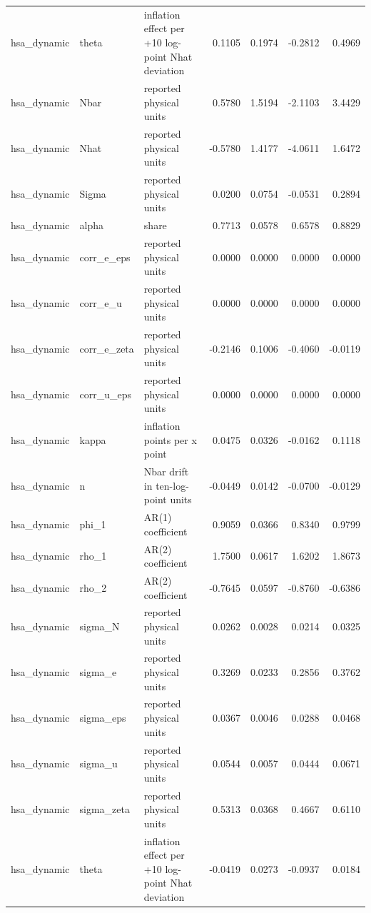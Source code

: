\begin{tabular}{lllrrrr}
hsa\_dynamic & theta & inflation effect per +10 log-point Nhat deviation & 0.1105 & 0.1974 & -0.2812 & 0.4969 \\
hsa\_dynamic & Nbar & reported physical units & 0.5780 & 1.5194 & -2.1103 & 3.4429 \\
hsa\_dynamic & Nhat & reported physical units & -0.5780 & 1.4177 & -4.0611 & 1.6472 \\
hsa\_dynamic & Sigma & reported physical units & 0.0200 & 0.0754 & -0.0531 & 0.2894 \\
hsa\_dynamic & alpha & share & 0.7713 & 0.0578 & 0.6578 & 0.8829 \\
hsa\_dynamic & corr\_e\_eps & reported physical units & 0.0000 & 0.0000 & 0.0000 & 0.0000 \\
hsa\_dynamic & corr\_e\_u & reported physical units & 0.0000 & 0.0000 & 0.0000 & 0.0000 \\
hsa\_dynamic & corr\_e\_zeta & reported physical units & -0.2146 & 0.1006 & -0.4060 & -0.0119 \\
hsa\_dynamic & corr\_u\_eps & reported physical units & 0.0000 & 0.0000 & 0.0000 & 0.0000 \\
hsa\_dynamic & kappa & inflation points per x point & 0.0475 & 0.0326 & -0.0162 & 0.1118 \\
hsa\_dynamic & n & Nbar drift in ten-log-point units & -0.0449 & 0.0142 & -0.0700 & -0.0129 \\
hsa\_dynamic & phi\_1 & AR(1) coefficient & 0.9059 & 0.0366 & 0.8340 & 0.9799 \\
hsa\_dynamic & rho\_1 & AR(2) coefficient & 1.7500 & 0.0617 & 1.6202 & 1.8673 \\
hsa\_dynamic & rho\_2 & AR(2) coefficient & -0.7645 & 0.0597 & -0.8760 & -0.6386 \\
hsa\_dynamic & sigma\_N & reported physical units & 0.0262 & 0.0028 & 0.0214 & 0.0325 \\
hsa\_dynamic & sigma\_e & reported physical units & 0.3269 & 0.0233 & 0.2856 & 0.3762 \\
hsa\_dynamic & sigma\_eps & reported physical units & 0.0367 & 0.0046 & 0.0288 & 0.0468 \\
hsa\_dynamic & sigma\_u & reported physical units & 0.0544 & 0.0057 & 0.0444 & 0.0671 \\
hsa\_dynamic & sigma\_zeta & reported physical units & 0.5313 & 0.0368 & 0.4667 & 0.6110 \\
hsa\_dynamic & theta & inflation effect per +10 log-point Nhat deviation & -0.0419 & 0.0273 & -0.0937 & 0.0184 \\

\end{tabular}
